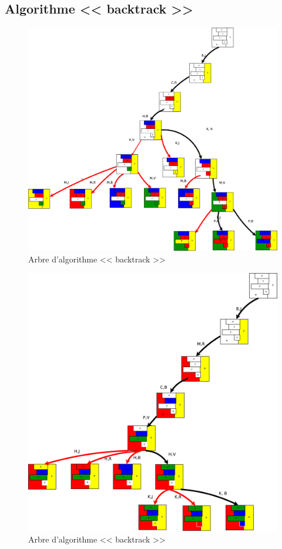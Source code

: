 \documentclass[12pt,a4paper,openany]{book}
\begin{document}
	\subsection{Algorithme << backtrack >>}
	\begin{figure}[H]
		\centering
		\includegraphics[width=19cm]{Diagramme15.eps}
		\caption{Arbre d'algorithme << backtrack >>}
	\end{figure}
	\begin{figure}[H]
		\centering
		\includegraphics[width=19cm]{Diagramme17.eps}
		\caption{Arbre d'algorithme << backtrack >>}
	\end{figure}
\end{document}
